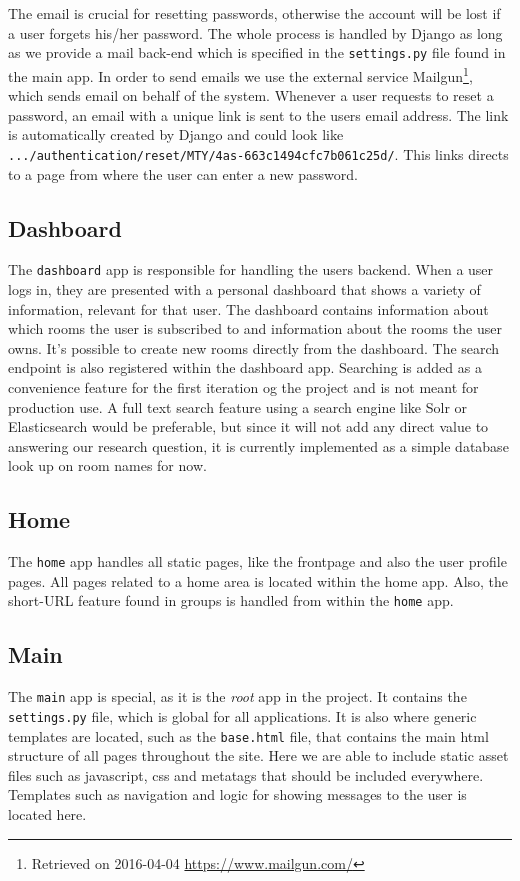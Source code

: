 The email is crucial for resetting passwords, otherwise the account will be lost if a user forgets his/her password. The whole process is handled by Django as long as we provide a mail back-end which is specified in the \texttt{settings.py} file found in the main app. In order to send emails we use the external service Mailgun\footnote{Retrieved on 2016-04-04 \url{https://www.mailgun.com/}}, which sends email on behalf of the system. Whenever a user requests to reset a password, an email with a unique link is sent to the users email address. The link is automatically created by Django and could look like \texttt{.../authentication/reset/MTY/4as-663c1494cfc7b061c25d/}. This links directs to a page from where the user can enter a new password.


\subsection{Dashboard}
The \texttt{dashboard} app is responsible for handling the users backend. When a user logs in, they are presented with a personal dashboard that shows a variety of information, relevant for that user.
The dashboard contains information about which rooms the user is subscribed to and information about the rooms the user owns. It's possible to create new rooms directly from the dashboard. The search endpoint is also registered within the dashboard app. Searching is added as a convenience feature for the first iteration og the project and is not meant for production use. A full text search feature using a search engine like Solr or Elasticsearch would be preferable, but since it will not add any direct value to answering our research question, it is currently implemented as a simple database look up on room names for now.


\subsection{Home} 
The \texttt{home} app handles all static pages, like the frontpage and also the user profile pages.
All pages related to a home area is located within the home app. Also, the short-URL feature found in groups is handled from within the \texttt{home} app.


\subsection{Main}
The \texttt{main} app is special, as it is the \emph{root} app in the project. It contains the \texttt{settings.py} file, which is global for all applications. It is also where generic templates are located, such as the \texttt{base.html} file, that contains the main html structure of all pages throughout the site. Here we are able to include static asset files such as javascript, css and metatags that should be included everywhere. Templates such as navigation and logic for showing messages to the user is located here.

